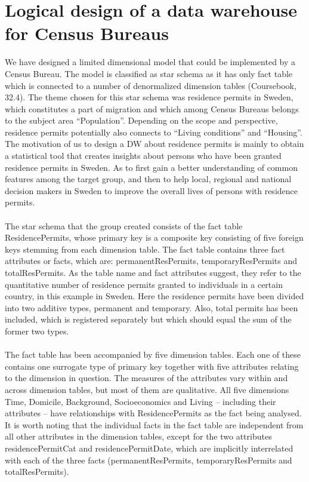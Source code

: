 \section{Logical design of a data warehouse for Census Bureaus}
We have designed a limited dimensional model that could be implemented by a Census Bureau. The model is classified as star schema as it has only fact table which is connected to a number of denormalized dimension tables (Coursebook, 32.4). The theme chosen for this star schema was residence permits in Sweden, which constitutes a part of migration and which among Census Bureaus belongs to the subject area “Population”. Depending on the scope and perspective, residence permits potentially also connects to “Living conditions” and “Housing”. The motivation of us to design a DW about residence permits is mainly to obtain a statistical tool that creates insights about persons who have been granted residence permits in Sweden. As to first gain a better understanding of common features among the target group, and then to help local, regional and national decision makers in Sweden to improve the overall lives of persons with residence permits. 
\\\\
The star schema that the group created consists of the fact table ResidencePermits, whose primary key is a composite key consisting of five foreign keys stemming from each dimension table. The fact table contains three fact attributes or facts, which are: permanentResPermits, temporaryResPermits and totalResPermits. As the table name and fact attributes suggest, they refer to the quantitative number of residence permits granted to individuals in a certain country, in this example in Sweden. Here the residence permits have been divided into two additive types, permanent and temporary. Also, total permits has been included, which is registered separately but which should equal the sum of the former two types. 
\\\\
The fact table has been accompanied by five dimension tables. Each one of these contains one surrogate type of primary key together with five attributes relating to the dimension in question. The measures of the attributes vary within and across dimension tables, but most of them are qualitative. All five dimensions Time, Domicile, Background, Socioeconomics and Living – including their attributes – have relationships with ResidencePermits as the fact being analysed. It is worth noting that the individual facts in the fact table are independent from all other attributes in the dimension tables, except for the two attributes residencePermitCat and residencePermitDate, which are implicitly interrelated with each of the three facts (permanentResPermits, temporaryResPermits and totalResPermits). 

